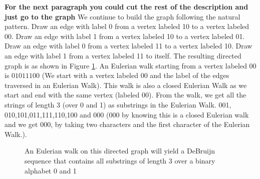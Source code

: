 \textbf{For the next paragraph you could cut the rest of the description and just go to the graph} We continue to build the graph following the natural pattern. Draw an edge with label 0 from a  vertex labeled 10 to a vertex labeled 00. Draw an edge with label 1 from a vertex labeled 10 to a vertex labeled 01.
Draw an edge with label 0 from a vertex labeled 11 to a vertex labeled 10. Draw an edge with label 1 from a vertex labeled 11 to itself.
The resulting directed graph is as shown in Figure \ref{4g6}. An Eulerian walk starting from a vertex labeled 00 is $0 1 0 1 1 1 0 0$  (We start with a vertex labeled 00 and the label of the edges traversed in an Eulerian Walk). This walk is also a closed Eulerian Walk as we start and end with the same vertex (labeled $00$).
From the walk, we get all the strings of length 3 (over 0 and 1) as substrings in the Eulerian Walk.
001, 010,101,011,111,110,100 and 000 (000 by knowing this is a closed Eulerian walk and we get 000, by taking two characters and the first character of the Eulerian Walk.).\\
\vspace{0.2in}
\begin{figure}
\begin{center}
\caption{ An Eulerian walk on this directed graph will yield a DeBruijn sequence that contains all substrings of length 3 over a binary alphabet 0 and 1}\label{4g6}
\end{center}
\end{figure}

